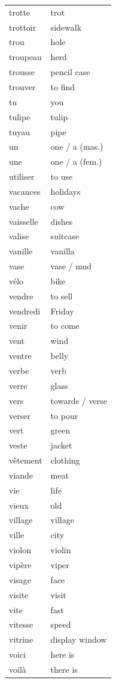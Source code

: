 \documentclass[12pt,a4paper]{article}
\begin{document}
\begin{longtable}{p{4cm} p{6cm}}
trotte & trot \\
trottoir & sidewalk \\
trou & hole \\
troupeau & herd \\
trousse & pencil case \\
trouver & to find \\
tu & you \\
tulipe & tulip \\
tuyau & pipe \\
un & one / a (mas.) \\
une & one / a (fem.) \\
utiliser & to use \\
vacances & holidays \\
vache & cow \\
vaisselle & dishes \\
valise & suitcase \\
vanille & vanilla \\
vase & vase / mud \\
vélo & bike \\
vendre & to sell \\
vendredi & Friday \\
venir & to come \\
vent & wind \\
ventre & belly \\
verbe & verb \\
verre & glass \\
vers & towards / verse \\
verser & to pour \\
vert & green \\
veste & jacket \\
vêtement & clothing \\
viande & meat \\
vie & life \\
vieux & old \\
village & village \\
ville & city \\
violon & violin \\
vipère & viper \\
visage & face \\
visite & visit \\
vite & fast \\
vitesse & speed \\
vitrine & display window \\
voici & here is \\
voilà & there is \\

\end{longtable}
\end{document}
